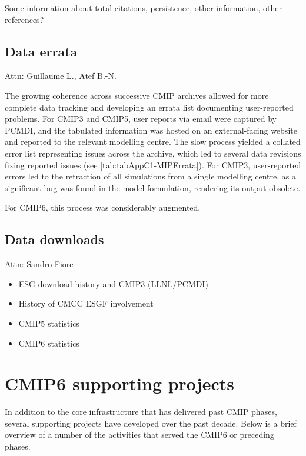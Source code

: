 \documentclass[gmd, preprint]{copernicus}
\newcommand{\mycomment}[1]{}
\def\cred#1{{\color{red}#1}}
\begin{document}
\cred{Some information about total citations, persistence, other information, other references?}
\mycomment{
https://www.wdc-climate.de/ui/statistics?type=cmip6_doi_registration
https://commons.datacite.org/repositories/8orcv25 - Master overview 6012 citations
https://www.wdc-climate.de/ords/f?p=127:2 - CMIP6 data references
https://www.wdc-climate.de/ui/cmip6?input=CMIP6.ScenarioMIP.NOAA-GFDL.GFDL-CM4.ssp585
https://www.wdc-climate.de/ui/cmip6?input=input4MIPs.CMIP6.CMIP.PCMDI
}


\subsection{Data errata}
\cred{Attn: Guillaume L., Atef B.-N.}

The growing coherence across successive CMIP archives allowed for more complete data tracking and developing an errata list documenting user-reported problems. For CMIP3 and CMIP5, user reports via email were captured by PCMDI, and the tabulated information was hosted on an external-facing website and reported to the relevant modelling centre. The slow process yielded a collated error list representing issues across the archive, which led to several data revisions fixing reported issues (see \autoref{tab:tabAppC1-MIPErrata}). For CMIP3, user-reported errors led to the retraction of all simulations from a single modelling centre, as a significant bug was found in the model formulation, rendering its output obsolete.

\cred{For CMIP6, this process was considerably augmented.}


\subsection{Data downloads}
\cred{Attn: Sandro Fiore}

\cred{
\begin{itemize}
	\item ESG download history and CMIP3 (LLNL/PCMDI)
    \item History of CMCC ESGF involvement
	\item CMIP5 statistics
	\item CMIP6 statistics
\end{itemize}
}

\section{CMIP6 supporting projects}
\label{sec:CMIP6SupportingProjects}
In addition to the core infrastructure that has delivered past CMIP phases, several supporting projects have developed over the past decade. Below is a brief overview of a number of the activities that served the CMIP6 or preceding phases.
\end{document}
